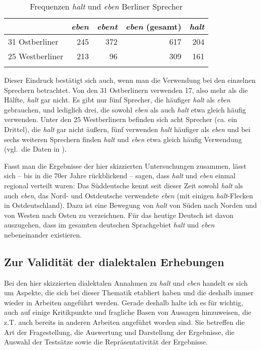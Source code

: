 \begin{table} 
		\begin{tabular}{lrrrr} 
		\lsptoprule
 		& \textit{{eben}} & \textit{{ebent}} & \textit{{eben}} (gesamt) & \textit{{halt}}\\\midrule
 		31 Ostberliner & 245 & 372 & 617 & 204 \\
 		25 Westberliner & 213 & 96 & 309 & 161 \\
 		\lspbottomrule
  		\end{tabular}			
	  \caption{Frequenzen \textit{halt} und \textit{eben} Berliner Sprecher \citep[221]{Dittmar2000}\label{tab:541}}
\end{table}	
 		
Dieser Eindruck bestätigt sich auch, wenn man die Verwendung bei den einzelnen Sprechern betrachtet. Von den 31 Ostberlinern verwenden 17, also mehr als die Hälfte, \textit{halt} gar nicht. Es gibt nur fünf Sprecher, die häufiger \textit{halt} als \textit{eben} gebrauchen, und lediglich drei, die sowohl \textit{eben} als auch \textit{halt} etwa gleich häufig verwenden. Unter den 25 Westberlinern befinden sich acht Sprecher (ca. ein Drittel), die \textit{halt} gar nicht äußern, fünf verwenden \textit{halt} häufiger als \textit{eben} und bei sechs weiteren Sprechern finden \textit{halt} und \textit{eben} etwa gleich häufig Verwendung (vgl.\ die Daten in \citealt[121--122]{Dittmar2000}).

Fasst man die Ergebnisse der hier skizzierten Untersuchungen zusammen, lässt sich – bis in die 70er Jahre rückblickend – sagen, dass \textit{halt} und \textit{eben} einmal regional verteilt waren: Das Süddeutsche kennt seit dieser Zeit sowohl \textit{halt} als auch \textit{eben}, das Nord- und Ostdeutsche verwendete \textit{eben} (mit einigen \textit{halt}-Flecken in Ostdeutschland). Dazu ist eine Bewegung von \textit{halt} von Süden nach Norden und von Westen nach Osten zu verzeichnen. Für das heutige Deutsch ist davon auszugehen, dass im gesamten deutschen Sprachgebiet \textit{halt} und \textit{eben} nebeneinander existieren.

\subsection{Zur Validität der dialektalen Erhebungen}
\label{sec:val}
Bei den hier skizzierten dialektalen Annahmen zu \textit{halt} und \textit{eben} handelt es sich um Aspekte, die sich bei dieser Thematik etabliert haben und die deshalb immer wieder in Arbeiten angeführt werden. Gerade deshalb halte ich es für wichtig, auch auf einige Kritikpunkte und fragliche Basen von Aussagen hinzuweisen, die z.T. auch bereits in anderen Arbeiten angeführt worden sind. Sie betreffen die Art der Fragestellung, die Auswertung und Darstellung der Ergebnisse, die Auswahl der Testsätze sowie die Repräsentativität der Ergebnisse.

